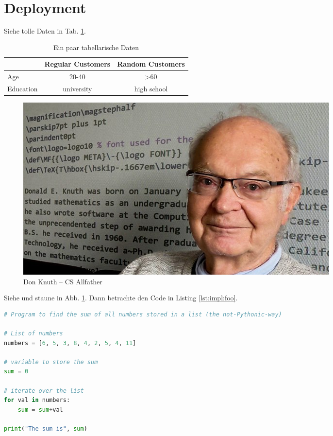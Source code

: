 \section{Deployment}

Siehe tolle Daten in Tab. \ref{tab:impl:data}.

\begin{table}
    \centering
    \begin{tabular}{|lcc|}
    \hline
              & \textbf{Regular Customers} & \textbf{Random Customers} \\ \hline
    Age       & 20-40                      & \textgreater{}60          \\ \hline
    Education & university                 & high school               \\ \hline
    \end{tabular}
    \caption{Ein paar tabellarische Daten}
    \label{tab:impl:data}
\end{table}

\begin{figure}
    \centering
    \includegraphics[scale=0.5]{pics/knuthi.jpg}
    \caption{Don Knuth -- CS Allfather}
    \label{fig:impl:knuth}
\end{figure}

Siehe und staune in Abb. \ref{fig:impl:knuth}.
Dann betrachte den Code in Listing \ref{lst:impl:foo}.

\begin{lstlisting}[language=Python,caption=Some code,label=lst:impl:foo]
# Program to find the sum of all numbers stored in a list (the not-Pythonic-way)

# List of numbers
numbers = [6, 5, 3, 8, 4, 2, 5, 4, 11]

# variable to store the sum
sum = 0

# iterate over the list
for val in numbers:
    sum = sum+val

print("The sum is", sum)
\end{lstlisting}
